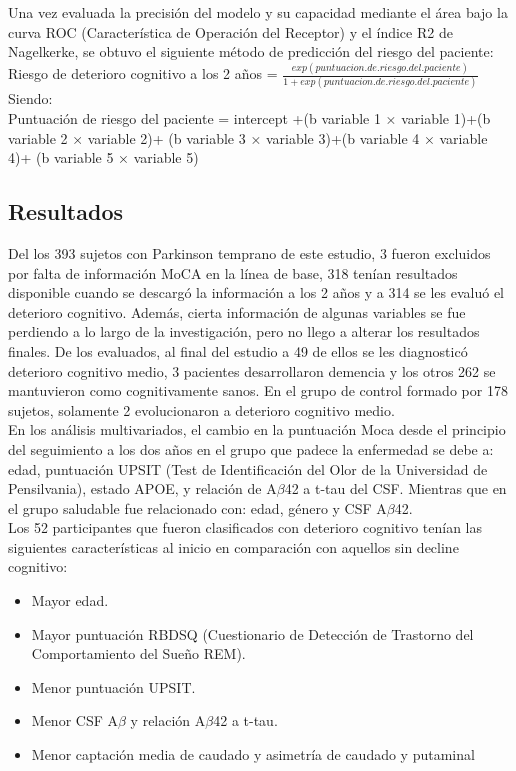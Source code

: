 \begin{description}
		Una vez evaluada la precisión del modelo y su capacidad mediante el área bajo la curva ROC (Característica de Operación del Receptor) y el índice R2 de Nagelkerke, se obtuvo el siguiente método de predicción del riesgo del paciente:\\
		
		Riesgo de deterioro cognitivo a los 2 años = $\frac{exp(puntuacion.de.riesgo.del.paciente)}{1 + exp(puntuacion.de.riesgo.del.paciente)}$\\
		
		Siendo:\\
		
		Puntuación de riesgo del paciente = intercept +(b variable 1 ×
		variable 1)+(b variable 2 × variable 2)+ (b variable 3 × 
		variable 3)+(b variable 4 × variable 4)+ (b variable 5 ×
		variable 5)
		
	\end{description}
	
	\subsection{Resultados }
	
	Del los 393 sujetos con Parkinson temprano de este estudio, 3 fueron excluidos por falta de información MoCA en la línea de base, 318 tenían resultados disponible cuando se descargó la información a los 2 años y a 314 se les evaluó el deterioro cognitivo. Además, cierta información de algunas variables se fue perdiendo a lo largo de la investigación, pero no llego a alterar los resultados finales. De los evaluados, al final del estudio a 49 de ellos se les diagnosticó deterioro cognitivo medio, 3 pacientes desarrollaron demencia y los otros 262 se mantuvieron como cognitivamente sanos. En el grupo de control formado por 178 sujetos, solamente 2 evolucionaron a deterioro cognitivo medio.\\
	
	En los análisis multivariados, el cambio en la puntuación Moca desde el principio del seguimiento a los dos años en el grupo que padece la enfermedad se debe a: edad, puntuación UPSIT (Test de Identificación del Olor de la Universidad de Pensilvania), 
	estado APOE, y relación de A$\beta$42 a t-tau del CSF. Mientras que en el grupo saludable fue relacionado con: edad, género y CSF A$\beta$42.\\
	
	Los 52 participantes que fueron clasificados con deterioro cognitivo tenían las siguientes características al inicio en comparación con aquellos sin decline cognitivo:
	\begin{itemize}
		\item Mayor edad.
		\item Mayor puntuación RBDSQ (Cuestionario de Detección de Trastorno del Comportamiento del Sueño REM).
		\item Menor puntuación UPSIT.
		\item Menor CSF A$\beta$ y relación A$\beta$42 a t-tau.
		\item Menor captación media de caudado y
		asimetría de caudado y putaminal
	\end{itemize}	
	
